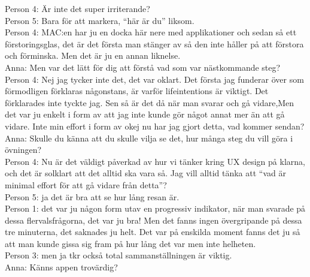 Person 4: Är inte det super irriterande? \\

Person 5: Bara för att markera, \enquote{här är du} liksom. \\

Person 4: MAC:en har ju en docka här nere med applikationer och sedan så ett förstoringsglas, det är det första man stänger av så den inte håller på att förstora och förminska. Men det är ju en annan liknelse. \\

Anna: Men var det lätt för dig att förstå vad som var nästkommande steg?\\

Person 4: Nej jag tycker inte det, det var oklart. Det första jag funderar över som förmodligen förklaras någonstans, är varför lifeintentions är viktigt. Det förklarades inte tyckte jag. Sen så är det då när man svarar och gå vidare,Men det var ju enkelt i form av att jag inte kunde gör något annat mer än att gå vidare. Inte min effort i form av okej nu har jag gjort detta, vad kommer sendan? \\

Anna: Skulle du känna att du skulle vilja se det, hur många steg du vill göra i övningen? \\

Person 4: Nu är det väldigt påverkad av hur vi tänker kring UX design på klarna, och det är solklart att det alltid ska vara så. Jag vill alltid tänka att \enquote{vad är minimal effort för att gå vidare från detta}? \\

Person 5: ja det är bra att se hur lång resan är. \\

Person 1: det var ju någon form utav en progressiv indikator, när man svarade på dessa flervalsfrågorna, det var ju bra! Men det fanns ingen övergripande på dessa tre minuterna, det saknades ju helt. Det var på enskilda moment fanns det ju så att man kunde gissa sig fram på hur lång det var men inte helheten. \\

Person 3: men ja tkr också total sammanställningen är viktig. \\

Anna: Känns appen trovärdig?\\

